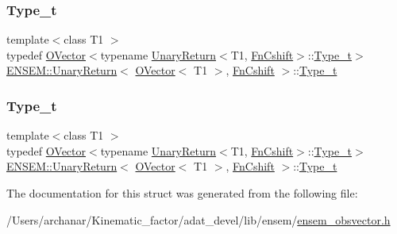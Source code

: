 \subsubsection{\texorpdfstring{Type\_t}{Type\_t}\hspace{0.1cm}{\footnotesize\ttfamily [1/2]}}
{\footnotesize\ttfamily template$<$class T1 $>$ \\
typedef \mbox{\hyperlink{classENSEM_1_1OVector}{O\+Vector}}$<$typename \mbox{\hyperlink{structENSEM_1_1UnaryReturn}{Unary\+Return}}$<$T1, \mbox{\hyperlink{structENSEM_1_1FnCshift}{Fn\+Cshift}}$>$\+::\mbox{\hyperlink{structENSEM_1_1UnaryReturn_3_01OVector_3_01T1_01_4_00_01FnCshift_01_4_a6a3a9c4bf8437765b92d9c0d26f56a19}{Type\+\_\+t}}$>$ \mbox{\hyperlink{structENSEM_1_1UnaryReturn}{E\+N\+S\+E\+M\+::\+Unary\+Return}}$<$ \mbox{\hyperlink{classENSEM_1_1OVector}{O\+Vector}}$<$ T1 $>$, \mbox{\hyperlink{structENSEM_1_1FnCshift}{Fn\+Cshift}} $>$\+::\mbox{\hyperlink{structENSEM_1_1UnaryReturn_3_01OVector_3_01T1_01_4_00_01FnCshift_01_4_a6a3a9c4bf8437765b92d9c0d26f56a19}{Type\+\_\+t}}}

\mbox{\label{structENSEM_1_1UnaryReturn_3_01OVector_3_01T1_01_4_00_01FnCshift_01_4_a6a3a9c4bf8437765b92d9c0d26f56a19}} 
\subsubsection{\texorpdfstring{Type\_t}{Type\_t}\hspace{0.1cm}{\footnotesize\ttfamily [2/2]}}
{\footnotesize\ttfamily template$<$class T1 $>$ \\
typedef \mbox{\hyperlink{classENSEM_1_1OVector}{O\+Vector}}$<$typename \mbox{\hyperlink{structENSEM_1_1UnaryReturn}{Unary\+Return}}$<$T1, \mbox{\hyperlink{structENSEM_1_1FnCshift}{Fn\+Cshift}}$>$\+::\mbox{\hyperlink{structENSEM_1_1UnaryReturn_3_01OVector_3_01T1_01_4_00_01FnCshift_01_4_a6a3a9c4bf8437765b92d9c0d26f56a19}{Type\+\_\+t}}$>$ \mbox{\hyperlink{structENSEM_1_1UnaryReturn}{E\+N\+S\+E\+M\+::\+Unary\+Return}}$<$ \mbox{\hyperlink{classENSEM_1_1OVector}{O\+Vector}}$<$ T1 $>$, \mbox{\hyperlink{structENSEM_1_1FnCshift}{Fn\+Cshift}} $>$\+::\mbox{\hyperlink{structENSEM_1_1UnaryReturn_3_01OVector_3_01T1_01_4_00_01FnCshift_01_4_a6a3a9c4bf8437765b92d9c0d26f56a19}{Type\+\_\+t}}}



The documentation for this struct was generated from the following file\+:\begin{DoxyCompactItemize}
\item 
/\+Users/archanar/\+Kinematic\+\_\+factor/adat\+\_\+devel/lib/ensem/\mbox{\hyperlink{lib_2ensem_2ensem__obsvector_8h}{ensem\+\_\+obsvector.\+h}}\end{DoxyCompactItemize}

